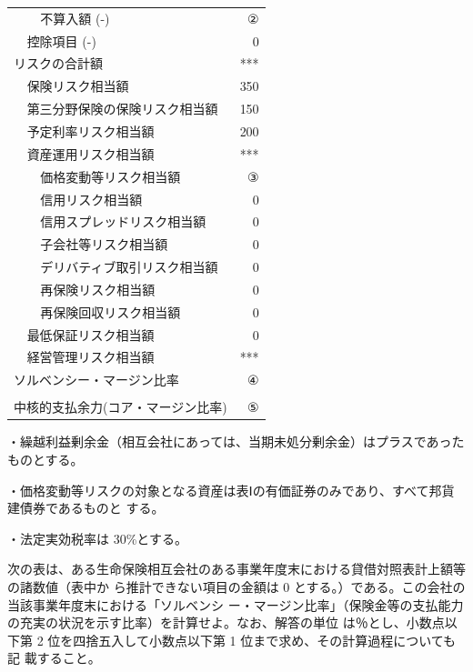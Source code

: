 \documentclass[report,gutter=10mm,fore-edge=10mm,uplatex,dvipdfmx]{jlreq}
\begin{document}
\begin{tabular}{|l|l|l|l|r|}
&& \multicolumn{2}{l|}{不算入額 (-)} & ② \\ \cline{2-5}
& \multicolumn{3}{|l|}{控除項目 (-)} & 0 \\ \cline{1-5}
 \multicolumn{4}{|l|}{リスクの合計額} & ***\\ \cline{2-5}
& \multicolumn{3}{|l|}{保険リスク相当額} & 350\\ \cline{2-5}
& \multicolumn{3}{|l|}{第三分野保険の保険リスク相当額} & 150\\ \cline{2-5}
& \multicolumn{3}{|l|}{予定利率リスク相当額} & 200\\ \cline{2-5}
& \multicolumn{3}{|l|}{資産運用リスク相当額} & ***\\ \cline{3-5}
&& \multicolumn{2}{l|}{価格変動等リスク相当額} & ③ \\ \cline{3-5}
&& \multicolumn{2}{l|}{信用リスク相当額} & 0 \\ \cline{3-5}
&& \multicolumn{2}{l|}{信用スプレッドリスク相当額} & 0 \\ \cline{3-5}
&& \multicolumn{2}{l|}{子会社等リスク相当額} & 0 \\ \cline{3-5}
&& \multicolumn{2}{l|}{デリバティブ取引リスク相当額} & 0 \\ \cline{3-5}
&& \multicolumn{2}{l|}{再保険リスク相当額} & 0 \\ \cline{3-5}
&& \multicolumn{2}{l|}{再保険回収リスク相当額} & 0 \\ \cline{2-5}
& \multicolumn{3}{|l|}{最低保証リスク相当額} & 0\\ \cline{2-5}
& \multicolumn{3}{|l|}{経営管理リスク相当額} & ***\\ \cline{1-5}
 \multicolumn{4}{|l|}{ソルベンシー・マージン比率 } & ④\\ \cline{1-5}
 \multicolumn{5}{c}{  }\\\cline{1-5}
 \multicolumn{4}{|l|}{中核的支払余力(コア・マージン比率)} & ⑤\\ \cline{1-5}
\end{tabular}

・繰越利益剰余金（相互会社にあっては、当期未処分剰余金）はプラスであったものとする。

・価格変動等リスクの対象となる資産は表Ⅰの有価証券のみであり、すべて邦貨建債券であるものと
する。

・法定実効税率は 30\%とする。

次の表は、ある生命保険相互会社のある事業年度末における貸借対照表計上額等の諸数値（表中か
ら推計できない項目の金額は 0 とする。）である。この会社の当該事業年度末における「ソルベンシ
ー・マージン比率」（保険金等の支払能力の充実の状況を示す比率）を計算せよ。なお、解答の単位
は％とし、小数点以下第 2 位を四捨五入して小数点以下第 1 位まで求め、その計算過程についても記
載すること。
\end{document}
